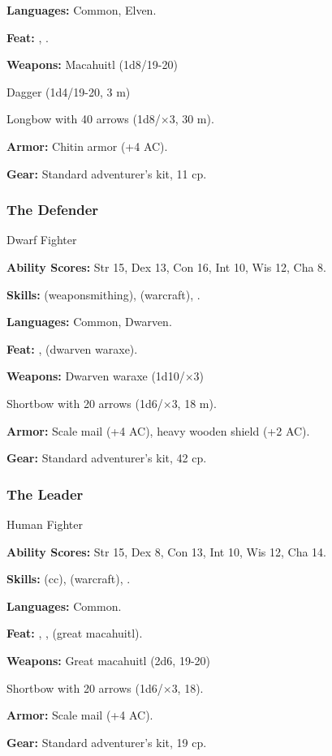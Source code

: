 \textbf{Languages:} Common, Elven.

\textbf{Feat:} , .

\textbf{Weapons:} Macahuitl (1d8/19-20)

Dagger (1d4/19-20, 3 m)

Longbow with 40 arrows (1d8/$\times$3, 30 m).

\textbf{Armor:} Chitin armor (+4 AC).

\textbf{Gear:} Standard adventurer's kit, 11 cp.

\subsubsection{The Defender}
Dwarf Fighter

\textbf{Ability Scores:} Str 15, Dex 13, Con 16, Int 10, Wis 12, Cha 8.

\textbf{Skills:}  (weaponsmithing),  (warcraft), .

\textbf{Languages:} Common, Dwarven.

\textbf{Feat:} ,  (dwarven waraxe).

\textbf{Weapons:} Dwarven waraxe (1d10/$\times$3)

Shortbow with 20 arrows (1d6/$\times$3, 18 m).

\textbf{Armor:} Scale mail (+4 AC), heavy wooden shield (+2 AC).

\textbf{Gear:} Standard adventurer's kit, 42 cp.

\subsubsection{The Leader}
Human Fighter

\textbf{Ability Scores:} Str 15, Dex 8, Con 13, Int 10, Wis 12, Cha 14.

\textbf{Skills:}  (cc),  (warcraft), .

\textbf{Languages:} Common.

\textbf{Feat:} , ,  (great macahuitl).

\textbf{Weapons:} Great macahuitl (2d6, 19-20)

Shortbow with 20 arrows (1d6/$\times$3, 18).

\textbf{Armor:} Scale mail (+4 AC).

\textbf{Gear:} Standard adventurer's kit, 19 cp.

